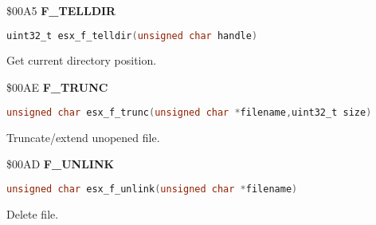 \$00A5 \textbf{F\_TELLDIR}

\begin{lstlisting}[language=C]
uint32_t esx_f_telldir(unsigned char handle)
\end{lstlisting}

Get current directory position.


\$00AE \textbf{F\_TRUNC}

\begin{lstlisting}[language=C]
unsigned char esx_f_trunc(unsigned char *filename,uint32_t size)
\end{lstlisting}

Truncate/extend unopened file.

%

\$00AD \textbf{F\_UNLINK}

\begin{lstlisting}[language=C]
unsigned char esx_f_unlink(unsigned char *filename)
\end{lstlisting}

Delete file.

